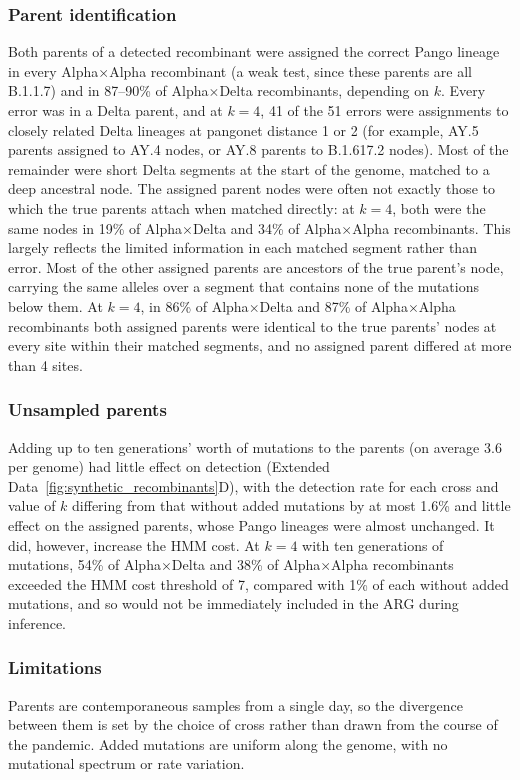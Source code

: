 \documentclass[12pt]{article}
\newcommand{\edref}[1]{Extended Data~\ref{#1}}
\begin{document}
\subsubsection{Parent identification}
Both parents of a detected recombinant were assigned the correct Pango lineage
in every Alpha$\times$Alpha recombinant (a weak test, since these parents
are all B.1.1.7) and in 87--90\% of Alpha$\times$Delta recombinants,
depending on $k$.
Every error was in a Delta parent, and at $k=4$, 41 of the 51 errors
were assignments to closely related Delta lineages at pangonet distance 1 or 2
(for example, AY.5 parents assigned to AY.4 nodes,
or AY.8 parents to B.1.617.2 nodes).
Most of the remainder were short Delta segments
at the start of the genome, matched to a deep ancestral node.
The assigned parent nodes were often not exactly those to which the true parents attach
when matched directly:
at $k=4$, both were the same nodes in 19\% of Alpha$\times$Delta
and 34\% of Alpha$\times$Alpha recombinants.
This largely reflects the limited information in each matched segment
rather than error. Most of the other assigned parents are ancestors of
the true parent's node, carrying the same alleles over a segment
that contains none of the mutations below them.
At $k=4$, in 86\% of Alpha$\times$Delta and 87\% of Alpha$\times$Alpha recombinants
both assigned parents were identical to the true parents' nodes
at every site within their matched segments,
and no assigned parent differed at more than 4 sites.

\subsubsection{Unsampled parents}
Adding up to ten generations' worth of mutations to the parents
(on average 3.6 per genome) had little effect on detection
(\edref{fig:synthetic_recombinants}D),
with the detection rate for each cross and value of $k$
differing from that without added mutations by at most 1.6\%
and little effect on the assigned parents, whose Pango lineages were almost unchanged.
It did, however, increase the HMM cost.
At $k=4$ with ten generations of mutations,
54\% of Alpha$\times$Delta and 38\% of Alpha$\times$Alpha recombinants
exceeded the HMM cost threshold of 7, compared with 1\% of each
without added mutations,
and so would not be immediately included in the ARG during inference.

\subsubsection{Limitations}
Parents are contemporaneous samples from a single day,
so the divergence between them is set by the choice of cross
rather than drawn from the course of the pandemic.
Added mutations are uniform along the genome,
with no mutational spectrum or rate variation.
\end{document}
